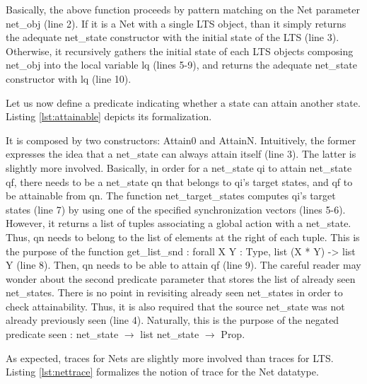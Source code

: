	\noindent Basically, the above function proceeds by pattern matching on the \textsf{Net} parameter \textsf{net\_obj} (line 2). 
	If it is a \textsf{Net} with a single \textsf{LTS} object, than it simply returns the adequate \textsf{net\_state}
	constructor with the initial state of the \textsf{LTS} (line 3). Otherwise, it recursively
	gathers the initial state of each \textsf{LTS} objects composing \textsf{net\_obj} into
	the local variable \textsf{lq} (lines 5-9), and returns the adequate \textsf{net\_state}
	constructor with \textsf{lq} (line 10).
	

		Let us now define a predicate indicating whether a state can attain another state. Listing \ref{lst:attainable}
	depicts its formalization.
			
				
	
		
	\noindent It is composed by two constructors: \textsf{Attain0} and \textsf{AttainN}. Intuitively,
	the former expresses the idea that a \textsf{net\_state} can always attain itself (line 3).
	The latter is slightly more involved. Basically, in order for a \textsf{net\_state} \textsf{qi}
	to attain \textsf{net\_state} \textsf{qf}, there needs to be a \textsf{net\_state} \textsf{qn}
	that belongs to \textsf{qi}'s target states, and \textsf{qf} to be attainable from \textsf{qn}.
	The function \textsf{net\_target\_states} computes \textsf{qi}'s target states (line 7) by using
	one of the specified synchronization vectors (lines 5-6). 
	However, it returns a list of tuples associating a global \textsf{action} with a \textsf{net\_state}.
	Thus, \textsf{qn} needs to belong to the list of elements at the right of each tuple.	
	This is the purpose of the function 
	\textsf{get\_list\_snd : forall X Y : Type, list (X * Y) -> list Y}	(line 8). Then, 
	\textsf{qn} needs to be able to attain \textsf{qf} (line 9). The careful reader may wonder
	about the second predicate parameter that stores the list of already seen \textsf{net\_state}s. 
	There is no point in revisiting already seen \textsf{net\_state}s in order to check 
	attainability. Thus, it is also required that the source \textsf{net\_state} was not already
	previously seen (line 4). Naturally, this is the purpose of the negated predicate
	\textsf{seen : net\_state $\rightarrow$ list net\_state $\rightarrow$ Prop}.
	
			
		As expected, traces for \textsf{Net}s are slightly more involved than traces for \textsc{LTS}. 
	Listing \ref{lst:nettrace} formalizes the notion of trace for the \textsf{Net} datatype.
			

